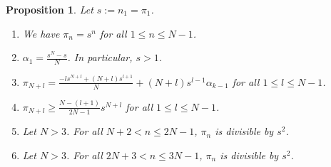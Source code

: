 \documentclass[10pt,a4paper]{amsart}
\newtheorem{prop}{Proposition}
\begin{document}
\begin{prop}\label{seqp}
Let $s:=n_1=\pi_1$.
\begin{enumerate}
    \item We have $\pi_n=s^n$ for all $1\leq n\leq N-1$.
    \item $\alpha_1=\frac{s^N-s}{N}$. In particular, $s>1$.
    \item $\pi_{N+l}=\frac{-ls^{N+l}+(N+l)s^{l+1}}{N}+(N+l)s^{l-1}\alpha_{k-1}$ for all $1\leq l\leq N-1$.
    \item $\pi_{N+l}\geq\frac{N-(l+1)}{2N-1}s^{N+l}$ for all $1\leq l\leq N-1$.
    \item Let $N>3$. For all $N+2<n\leq 2N-1$, $\pi_n$ is divisible by $s^2$.
    \item Let $N>3$. For all $2N+3<n\leq 3N-1$, $\pi_n$ is divisible by $s^2$.

    
    
\end{enumerate}
\end{prop}
\end{document}
